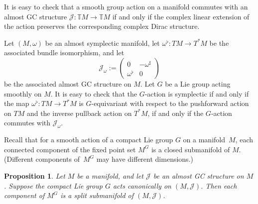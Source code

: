 \documentclass[pdftex]{sigma}
\newtheorem{Proposition}[Theorem]{Proposition}
\numberwithin{equation}{section}
\newcommand{\func}[3]{#1 \colon #2 \to #3}
\newcommand{\pont}[1]{\mathbb{T} {#1}}
\newcommand{\tang}{T}
\begin{document}
It is easy to check that a smooth group action on a manifold commutes with an almost GC structure $\func{\mathcal{J}}{\pont{M}}{\pont{M}}$ if and only if the complex linear extension of the action preserves the corresponding complex Dirac structure.


\begin{Example}
Let $(M,\omega)$ be an almost symplectic manifold, let $\func{\omega^{\flat}}{\tang M}{\tang^* M}$ be the associated bundle isomorphism, and let
\[
  \mathcal{J}_{\omega} :=
  \begin{pmatrix}
    0 & - \omega^{\sharp} \\
    \omega^{\flat} & 0
  \end{pmatrix}
\]
be the associated almost GC structure on $M$.  Let $G$ be a Lie group acting smoothly on $M$.  It is easy to check that the $G$-action is symplectic if and only if the map $\func{\omega^{\flat}}{\tang M}{\tang^* M}$ is $G$-equivariant with respect to the pushforward action on $\tang M$ and the inverse pullback action on $\tang^* M$, if and only if the $G$-action commutes with $\mathcal{J}_{\omega}$.
\end{Example}


Recall that for a smooth action of a compact Lie group $G$ on a manifold~$M$, each connected component of the f\/ixed point set $M^G$ is a closed submanifold of $M$.  (Dif\/ferent components of~$M^G$ may have dif\/ferent dimensions.)


\begin{Proposition}  \label{prop9}
Let $M$ be a manifold, and let $\mathcal{J}$ be an almost GC structure on $M$. Suppose the compact Lie group $G$ acts canonically on $(M,\mathcal{J})$.  Then each component of $M^{G}$ is a split submanifold of $(M,\mathcal{J})$.
\end{Proposition}
\end{document}
